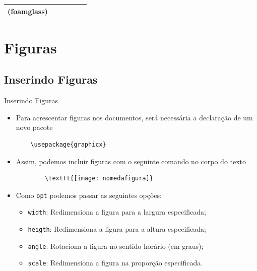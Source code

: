 \documentclass[c]{beamer}
\begin{document}
{\begin{frame}
\begin{table}[c]
\begin{center}
{\begin{tabular}{c|c|c|c|c|c}
						(foamglass)                                              &                                    &                                                 &                                    &                                        &\\ \hline
						\bottomrule
					\end{tabular}}
				\end{center}
			\end{table}
		\end{frame}    
%		


\section{Figuras}
\subsection{Inserindo Figuras}
\begin{frame}[fragile]{\sc Inserindo Figuras}	
\begin{itemize}
			\setlength\itemsep{0.3cm}
	\item Para {\color{blue} acrescentar figuras} nos documentos, será necessária a declaração de um {\color{blue} novo pacote}
    \begin{verbatim}
    \usepackage{graphicx}
    \end{verbatim}
    \item Assim, podemos incluir figuras com o seguinte comando no corpo do texto
    \begin{verbatim}
        \texttt{[image: nomedafigura]}
    \end{verbatim}
    \item Como \verb|opt| podemos passar as seguintes opções:
    \begin{itemize}
        \item \verb|width|: Redimensiona a figura para a largura especificada;
        \item \verb|heigth|: Redimensiona a figura para a altura especificada;
        \item \verb|angle|: Rotaciona a figura no sentido horário (em graus);
        \item \verb|scale|: Redimensiona a figura na proporção especificada.
    \end{itemize} 

\end{itemize}
\end{frame}

}
\end{document}
